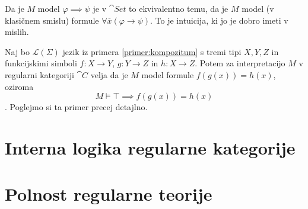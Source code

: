\documentclass[../kategoricna_logika.tex]{subfiles}
\begin{document}
Da je $M$ model $\varphi \implies \psi$ je v $\cat{Set}$ to ekvivalentno temu, da je $M$ model (v klasičnem smislu) formule $\forall \overline{x} (\varphi \rightarrow \psi)$. To je intuicija, ki jo je dobro imeti v mislih.
\begin{primer}
  Naj bo $\mathcal{L}(\Sigma)$ jezik iz primera \ref{primer:kompozitum} s tremi tipi $X,Y,Z$ in funkcijskimi simboli $f : X \to Y$, $g : Y \to Z$ in $h : X \to Z$. Potem za interpretacijo $M$ v regularni kategoriji $\cat{C}$ velja da je $M$ model formule $f(g(x)) = h(x)$, oziroma
  $$M \models \top \implies f(g(x)) = h(x)$$. Poglejmo si ta primer precej detajlno.
\end{primer}
%
\section{Interna logika regularne kategorije}
%
\section{Polnost regularne teorije}
\end{document}
